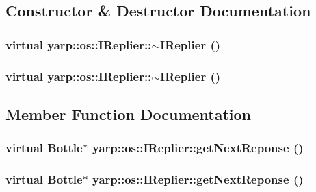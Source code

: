 \subsection{Constructor \& Destructor Documentation}
\hypertarget{classyarp_1_1os_1_1_i_replier_a197fe86812f17bc97cc7bf1b94473e84}{
\subsubsection[{$\sim$IReplier}]{\setlength{\rightskip}{0pt plus 5cm}virtual yarp::os::IReplier::$\sim$IReplier ()}}
\label{classyarp_1_1os_1_1_i_replier_a197fe86812f17bc97cc7bf1b94473e84}
\hypertarget{classyarp_1_1os_1_1_i_replier_a197fe86812f17bc97cc7bf1b94473e84}{
\subsubsection[{$\sim$IReplier}]{\setlength{\rightskip}{0pt plus 5cm}virtual yarp::os::IReplier::$\sim$IReplier ()}}
\label{classyarp_1_1os_1_1_i_replier_a197fe86812f17bc97cc7bf1b94473e84}


\subsection{Member Function Documentation}
\hypertarget{classyarp_1_1os_1_1_i_replier_a6b14c9b19625876caa5843b15537dcbd}{
\subsubsection[{getNextReponse}]{\setlength{\rightskip}{0pt plus 5cm}virtual Bottle$\ast$ yarp::os::IReplier::getNextReponse ()}}
\label{classyarp_1_1os_1_1_i_replier_a6b14c9b19625876caa5843b15537dcbd}
\hypertarget{classyarp_1_1os_1_1_i_replier_a6b14c9b19625876caa5843b15537dcbd}{
\subsubsection[{getNextReponse}]{\setlength{\rightskip}{0pt plus 5cm}virtual Bottle$\ast$ yarp::os::IReplier::getNextReponse ()}}
\label{classyarp_1_1os_1_1_i_replier_a6b14c9b19625876caa5843b15537dcbd}



